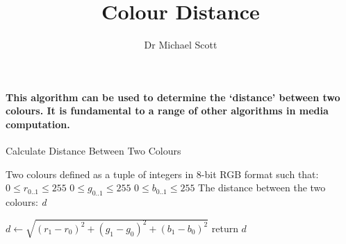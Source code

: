 \documentclass{../../../fal_assignment}
\title{Colour Distance}
\author{Dr Michael Scott}
\begin{document}
\maketitle
	
\paragraph{This algorithm can be used to determine the `distance' between two colours. It is fundamental to a range of other algorithms in media computation. }

\begin{algorithm}[ht]
	\caption{Calculate Distance Between Two Colours}
	\label{alg:algorithm}
	
	\begin{algorithmic}[1]
		\Require 
		\Statex Two colours defined as a tuple of integers in 8-bit RGB format such that:
		\Statex $0 \leq r_{0..1} \leq 255$
		\Statex $0 \leq g_{0..1} \leq 255$
		\Statex $0 \leq b_{0..1} \leq 255$
		\Ensure
		\Statex The distance between the two colours:
		\Statex \textit{d}
		
		\Statex
		
		\State $d \leftarrow \sqrt{ (r_1 - r_0)^2 + (g_1 - g_0)^2 + (b_1 - b_0)^2}$
		\State return $d$
	\end{algorithmic}
	
\end{algorithm}
\end{document}
